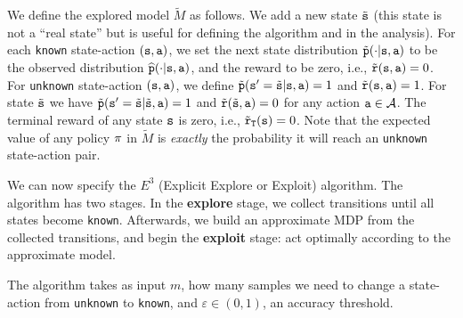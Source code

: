 We define the explored model $\widetilde{M}$ as follows. We add a new
state $\tilde{{\tt s}}$ (this state is not a ``real state'' but is useful for defining the algorithm and in the analysis). For each \texttt{known} state-action $({\tt s},{\tt a})$, we set the next
state distribution $\tilde{{\tt p}}(\cdot|{\tt s},{\tt a})$ to be the
observed distribution $\widehat{{\tt p}}(\cdot|{\tt s},{\tt a})$, and the
reward to be zero, i.e., $\tilde{{\tt r}}({\tt s},{\tt a})=0$.
%
For \texttt{unknown} state-action $({\tt s},{\tt a})$, we define
$\tilde{{\tt p}}({\tt s}'=\tilde{{\tt s}} | {\tt s},{\tt a})=1$ and
$\tilde{{\tt r}}({\tt s},{\tt a})=1$. For state $\tilde{{\tt s}}$ we
have $\tilde{{\tt p}}({\tt s}'=\tilde{{\tt s}} | \tilde{{\tt s}},{\tt a})=1$ and
$\tilde{{\tt r}}(\tilde{{\tt s}},{\tt a})=0$ for any action
${\tt a}\in\mathcal{A}$.
The terminal reward of any state ${\tt s}$ is zero, i.e., $\tilde{{\tt r}}_{\tt T}({\tt s})=0$.
%
Note that the expected value of any policy $\pi$ in $\widetilde{M}$
is {\em exactly} the probability it will reach an \texttt{unknown}
state-action pair.

We can now specify the $E^3$ (Explicit Explore or Exploit)
algorithm. The algorithm has two stages. In the \textbf{explore} stage, we collect transitions until all states become \texttt{known}. Afterwards, we build an approximate MDP from the collected transitions, and begin the \textbf{exploit} stage: act optimally according to the approximate model. 

The algorithm takes as input $m$, how many
samples we need to change a state-action from \texttt{unknown} to \texttt{known}, and $\varepsilon\in(0,1)$, an
accuracy threshold.


